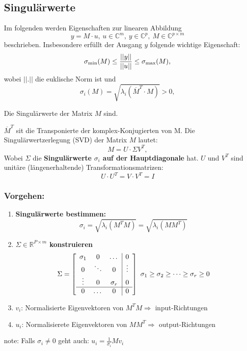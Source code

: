 \subsection{Singulärwerte}
    Im folgenden werden Eigenschaften zur linearen Abbildung\[y= M \cdot u,\ u \in \mathbb{C}^m,\ y\in\mathbb{C}^p,\ M\in\mathbb{C}^{p\times m}\]
    beschrieben. Insbesondere erfüllt der Ausgang $y$ folgende wichtige Eigenschaft:\[\sigma_{\textnormal{min}}(M)\leq\frac{||y||}{||u||}\leq\sigma_{\textnormal{max}}(M),\]
    wobei $||.||$ die euklische Norm ist und 
    \[\sigma_i(M)=\sqrt{\lambda_i(\overline{M}^T\cdot M)}>0,\]

    Die Singulärwerte der Matrix $M$ sind.

    $\overline{M}^T$ sit die Transponierte der komplex-Konjugierten von M. Die Singulärwertzerlegung (SVD) der Matrix $M$ lautet:
    \[M = U\cdot\Sigma V^T,\]
    Wobei $\Sigma$ die \textbf{Singulärwerte $\sigma_i$ auf der Hauptdiagonale} hat.
    $U$ und $V^T$ sind unitäre (längenerhaltende) Transformationsmatrizen:
    \[U\cdot U^T = V\cdot V^T = I\]
    \subsubsection{Vorgehen:}
        \begin{enumerate}
            \item \textbf{Singulärwerte bestimmen:}
                \[\sigma_i =\sqrt{\lambda_i(M^TM)}=\sqrt{\lambda_i(MM^T)}\]
            \item \textbf{$\Sigma \in                    \mathbb{R}^{P\times m}$ konstruieren}
                \[\Sigma = \left[\begin{array}{c c c | c}
                \sigma_1 & 0 & \dots  & 0 \\
                0&\ddots & 0 & \vdots \\
                \vdots & 0 & \sigma_r & 0 \\ \hline
                0 & \dots & 0 & 0              \end{array}\right]\ \sigma_1 \geq \sigma_2 \geq \dots \geq \sigma_r \geq 0 \] 
            \item $v_i$: Normalisierte Eigenvektoren     von $M^TM \Rightarrow$                   input-Richtungen
            \item $u_i$: Normalisierete Eigenvektoren von $MM^T
                \Rightarrow $ output-Richtungen
        \end{enumerate}
note: Falls $\sigma_i \neq 0$ geht auch: $u_i = \frac{1}{\sigma_i}Mv_i$
